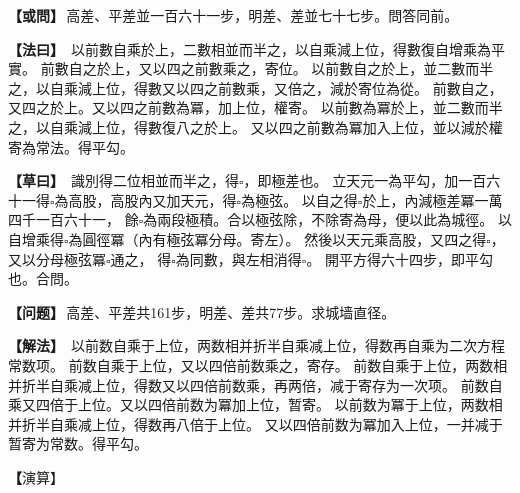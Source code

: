 \documentclass[11pt,a4paper]{article}
\let\origsquare\square
\renewcommand{\square}{\ensuremath{\origsquare}}%
\newcommand{\clOWEN}[1]{%
  \par\vspace{0.3em}%
  \noindent\textcolor{problemcolor}{\textbf{【或問】}}\,{\tradfont #1}\par\nopagebreak%
}
\newcommand{\mdOWEN}[1]{%
  \par\vspace{0.3em}%
  \noindent\textcolor{problemcolor}{\textbf{【问题】}}\,{\modfont #1}\par\nopagebreak%
}
\newcommand{\clFAYUE}[1]{%
  \par\noindent\textcolor{methodcolor}{\textbf{【法曰】}}\,{\tradfont #1}\par\nopagebreak%
}
\newcommand{\mdFAYUE}[1]{%
  \par\noindent\textcolor{methodcolor}{\textbf{【解法】}}\,{\modfont #1}\par\nopagebreak%
}
\newcommand{\clTSAOYUE}[1]{%
  \par\noindent\textcolor{workcolor}{\textbf{【草曰】}}\,{\tradfont #1}\par%
}
\newcommand{\mdTSAOYUE}[1]{%
  \par\noindent\textcolor{workcolor}{\textbf【演算】}}\,{\modfont #1}\par%
\begin{document}
\begin{paracol}{2}

\begin{leftcolumn}
\clOWEN{高差、平差並一百六十一步，明差、差並七十七步。問答同前。}

\clFAYUE{%
以前數自乘於上，二數相並而半之，以自乘減上位，得數復自增乘為平實。
前數自之於上，又以四之前數乘之，寄位。
以前數自之於上，並二數而半之，以自乘減上位，得數又以四之前數乘，又倍之，減於寄位為從。
前數自之，又四之於上。又以四之前數為冪，加上位，權寄。
以前數為冪於上，並二數而半之，以自乘減上位，得數復八之於上。
又以四之前數為冪加入上位，並以減於權寄為常法。得平勾。}

\clTSAOYUE{%
識別得二位相並而半之，得$\square$，即極差也。
立天元一為平勾，加一百六十一得$\square$為高股，高股內又加天元，得$\square$為極弦。
以自之得$\square$於上，內減極差冪一萬四千一百六十一，
餘$\square$為兩段極積。合以極弦除，不除寄為母，便以此為城徑。
以自增乘得$\square$為圓徑冪（內有極弦冪分母。寄左）。
然後以天元乘高股，又四之得$\square$，又以分母極弦冪$\square$通之，
得$\square$為同數，與左相消得$\square$。
開平方得六十四步，即平勾也。合問。}
\end{leftcolumn}

\switchcolumn

\begin{rightcolumn}
\mdOWEN{高差、平差共161步，明差、差共77步。求城墙直径。}

\mdFAYUE{%
以前数自乘于上位，两数相并折半自乘减上位，得数再自乘为二次方程常数项。
前数自乘于上位，又以四倍前数乘之，寄存。
前数自乘于上位，两数相并折半自乘减上位，得数又以四倍前数乘，再两倍，减于寄存为一次项。
前数自乘又四倍于上位。又以四倍前数为冪加上位，暂寄。
以前数为冪于上位，两数相并折半自乘减上位，得数再八倍于上位。
又以四倍前数为冪加入上位，一并减于暂寄为常数。得平勾。}

\mdTSAOYUE{%
辨识得：两位相并折半得$\square$即极差。
设天元一为平勾，加161得$\square$为高股，高股内再加天元得$\square$为极弦。
自乘得$\square$于上位，减去极差冪14,161，
余$\square$为两段极积。应以极弦除，不除寄为分母，便以此为城径。
自乘得$\square$为圆径冪（内有极弦冪分母。寄左）。
然后天元乘高股再四倍得$\square$，又以分母极弦冪$\square$通之，
得$\square$为同数，与左式相消得$\square$。
开平方得64步，即平勾。符合所问。}
\end{rightcolumn}

\end{paracol}
\end{document}
